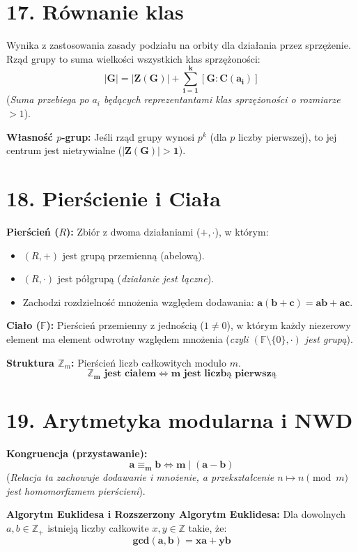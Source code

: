 \documentclass[12pt,a4paper]{article}
\begin{document}
\section*{17. Równanie klas}
Wynika z zastosowania zasady podziału na orbity dla działania przez sprzężenie. Rząd grupy to suma wielkości wszystkich klas sprzężoności: %
$$ \mathbf{|G| = |Z(G)| + \sum_{i=1}^k [G : C(a_i)]} $$ %
(\textit{Suma przebiega po $a_i$ będących reprezentantami klas sprzężoności o rozmiarze $> 1$}). %

\noindent\textbf{Własność $p$-grup:} Jeśli rząd grupy wynosi $p^k$ (dla $p$ liczby pierwszej), to jej centrum jest nietrywialne ($\mathbf{|Z(G)| > 1}$). %

\section*{18. Pierścienie i Ciała}
\noindent\textbf{Pierścień ($R$):} Zbiór z dwoma działaniami ($+, \cdot$), w którym: %
\begin{itemize}
    \item $(R, +)$ jest grupą przemienną (abelową). %
    \item $(R, \cdot)$ jest półgrupą (\textit{działanie jest łączne}). %
    \item Zachodzi rozdzielność mnożenia względem dodawania: $\mathbf{a(b+c) = ab+ac}$. %
\end{itemize}

\noindent\textbf{Ciało ($\mathbb{F}$):} Pierścień przemienny z jednością ($1 \neq 0$), w którym każdy niezerowy element ma element odwrotny względem mnożenia (\textit{czyli $(\mathbb{F} \setminus \{0\}, \cdot)$ jest grupą}). %

\noindent\textbf{Struktura $\mathbb{Z}_m$:} Pierścień liczb całkowitych modulo $m$. %
$$ \mathbf{\mathbb{Z}_m \text{ jest ciałem} \iff m \text{ jest liczbą pierwszą}} $$ %

\section*{19. Arytmetyka modularna i NWD}
\noindent\textbf{Kongruencja (przystawanie):} %
$$ \mathbf{a \equiv_m b \iff m \mid (a-b)} $$ %
(\textit{Relacja ta zachowuje dodawanie i mnożenie, a przekształcenie $n \mapsto n \pmod m$ jest homomorfizmem pierścieni}). %

\noindent\textbf{Algorytm Euklidesa i Rozszerzony Algorytm Euklidesa:} Dla dowolnych $a, b \in \mathbb{Z}_+$ istnieją liczby całkowite $x, y \in \mathbb{Z}$ takie, że: %
$$ \mathbf{gcd(a, b) = xa + yb} $$ %
\end{document}
